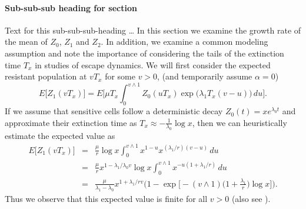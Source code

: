 \documentclass{bmcart}
\begin{document}
\paragraph*{Sub-sub-sub heading for section}
Text for this sub-sub-sub-heading \ldots
In this section we examine the growth rate of the mean of $Z_0$, $Z_1$ and $Z_2$. In
addition, we examine a common modeling assumption and note the
importance of considering the tails of the extinction time $T_x$ in
studies of escape dynamics.
We will first consider the expected resistant population at $vT_x$ for
some $v>0$, (and temporarily assume $\alpha=0$)
%
\[
 E \bigl[Z_1(vT_x) \bigr]= E
\biggl[\mu T_x\int_0^{v\wedge
1}Z_0(uT_x)
\exp \bigl(\lambda_1T_x(v-u) \bigr)\,du \biggr].
\]
%
If we assume that sensitive cells follow a deterministic decay
$Z_0(t)=xe^{\lambda_0 t}$ and approximate their extinction time as
$T_x\approx-\frac{1}{\lambda_0}\log x$, then we can heuristically
estimate the expected value as
%
\begin{eqnarray}\label{eqexpmuts}
E\bigl[Z_1(vT_x)\bigr] &=& \frac{\mu}{r}\log x
\int_0^{v\wedge1}x^{1-u}x^{({\lambda_1}/{r})(v-u)}\,du
\nonumber\\
&=& \frac{\mu}{r}x^{1-{\lambda_1}/{\lambda_0}v}\log x\int_0^{v\wedge
1}x^{-u(1+{\lambda_1}/{r})}\,du
\nonumber\\
&=& \frac{\mu}{\lambda_1-\lambda_0}x^{1+{\lambda_1}/{r}v} \biggl(1-\exp \biggl[-(v\wedge1) \biggl(1+
\frac{\lambda_1}{r}\biggr)\log x \biggr] \biggr).
\end{eqnarray}
%
Thus we observe that this expected value is finite for all $v>0$ (also see \cite{koon,khar,zvai,xjon,marg}).



\end{document}
